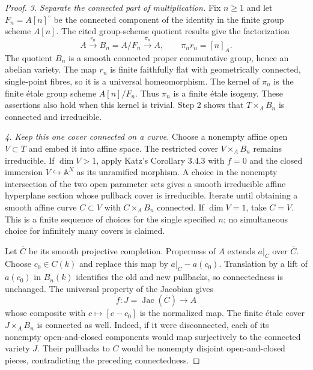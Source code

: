\begin{proof}
\emph{3. Separate the connected part of multiplication.}
Fix $n\geq1$ and let $F_n=A[n]^\circ$ be the connected
component of the identity in the finite group scheme
$A[n]$.  The cited group-scheme quotient results give
the factorization
\[
 A\xrightarrow{r_n}B_n=A/F_n
   \xrightarrow{\pi_n}A,\qquad
 \pi_n r_n=[n]_A.                                  \tag{CC.ALB.3}
\]
The quotient $B_n$ is a smooth connected proper
commutative group, hence an abelian variety.
The map $r_n$ is finite faithfully flat with geometrically
connected, single-point fibres, so it is a universal
homeomorphism.  The kernel of $\pi_n$ is the finite
\'{e}tale group scheme $A[n]/F_n$.  Thus $\pi_n$ is a
finite \'{e}tale isogeny.  These assertions also hold
when this kernel is trivial.
Step 2 shows that $T\times_A B_n$ is connected and
irreducible.

\emph{4. Keep this one cover connected on a curve.}
Choose a nonempty affine open $V\subset T$ and embed
it into affine space.  The restricted cover
$V\times_A B_n$ remains irreducible.  If $\dim V>1$,
apply Katz's Corollary 3.4.3 with $f=0$ and the closed
immersion $V\hookrightarrow\mathbb A^N$ as its
unramified morphism.  A choice in the nonempty
intersection of the two open parameter sets gives a
smooth irreducible affine hyperplane section whose
pullback cover is irreducible.  Iterate until obtaining
a smooth affine curve $C\subset V$ with
$C\times_A B_n$ connected.  If $\dim V=1$, take
$C=V$.  This is a finite sequence of choices for the
single specified $n$; no simultaneous choice for
infinitely many covers is claimed.

Let $\overline C$ be its smooth projective completion.
Properness of $A$ extends $a|_C$ over $\overline C$.
Choose $c_0\in C(k)$ and replace this map by
$a|_{\overline C}-a(c_0)$.  Translation by a lift of
$a(c_0)$ in $B_n(k)$ identifies the old and new
pullbacks, so connectedness is unchanged.
The universal property of the Jacobian gives
\[
 f:J=\operatorname{Jac}(\overline C)\longrightarrow A
\]
whose composite with $c\mapsto[c-c_0]$ is the
normalized map.  The finite \'{e}tale cover
$J\times_A B_n$ is connected as well.
Indeed, if it were disconnected, each of its
nonempty open-and-closed components would map
surjectively to the connected variety $J$.
Their pullbacks to $C$ would be nonempty disjoint
open-and-closed pieces, contradicting the preceding
connectedness.


\end{proof}
